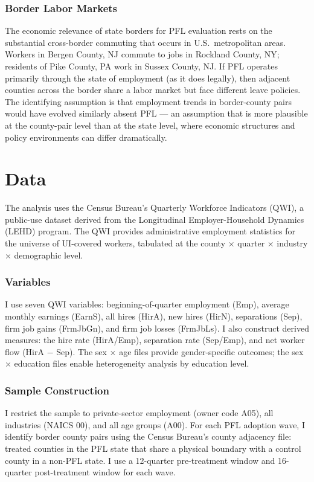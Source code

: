 \documentclass[12pt]{article}
\begin{document}
\subsubsection*{Border Labor Markets} The economic relevance of state borders for PFL evaluation rests on the substantial cross-border commuting that occurs in U.S.\ metropolitan areas. Workers in Bergen County, NJ commute to jobs in Rockland County, NY; residents of Pike County, PA work in Sussex County, NJ. If PFL operates primarily through the state of employment (as it does legally), then adjacent counties across the border share a labor market but face different leave policies. The identifying assumption is that employment trends in border-county pairs would have evolved similarly absent PFL --- an assumption that is more plausible at the county-pair level than at the state level, where economic structures and policy environments can differ dramatically.


\section{Data}

The analysis uses the Census Bureau's Quarterly Workforce Indicators (QWI), a public-use dataset derived from the Longitudinal Employer-Household Dynamics (LEHD) program. The QWI provides administrative employment statistics for the universe of UI-covered workers, tabulated at the county $\times$ quarter $\times$ industry $\times$ demographic level.

\subsubsection*{Variables} I use seven QWI variables: beginning-of-quarter employment (Emp), average monthly earnings (EarnS), all hires (HirA), new hires (HirN), separations (Sep), firm job gains (FrmJbGn), and firm job losses (FrmJbLs). I also construct derived measures: the hire rate (HirA/Emp), separation rate (Sep/Emp), and net worker flow (HirA $-$ Sep). The sex $\times$ age files provide gender-specific outcomes; the sex $\times$ education files enable heterogeneity analysis by education level.

\subsubsection*{Sample Construction} I restrict the sample to private-sector employment (owner code A05), all industries (NAICS 00), and all age groups (A00). For each PFL adoption wave, I identify border county pairs using the Census Bureau's county adjacency file: treated counties in the PFL state that share a physical boundary with a control county in a non-PFL state. I use a 12-quarter pre-treatment window and 16-quarter post-treatment window for each wave.
\end{document}
